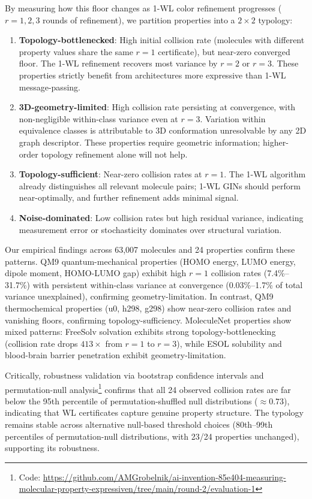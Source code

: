 \documentclass[11pt,letterpaper]{article}
\begin{document}
By measuring how this floor changes as 1-WL color refinement progresses ($r=1, 2, 3$ rounds of refinement), we partition properties into a $2\times2$ typology:

\begin{enumerate}
\item \textbf{Topology-bottlenecked}: High initial collision rate (molecules with different property values share the same $r=1$ certificate), but near-zero converged floor. The 1-WL refinement recovers most variance by $r=2$ or $r=3$. These properties strictly benefit from architectures more expressive than 1-WL message-passing.

\item \textbf{3D-geometry-limited}: High collision rate persisting at convergence, with non-negligible within-class variance even at $r=3$. Variation within equivalence classes is attributable to 3D conformation unresolvable by any 2D graph descriptor. These properties require geometric information; higher-order topology refinement alone will not help.

\item \textbf{Topology-sufficient}: Near-zero collision rates at $r=1$. The 1-WL algorithm already distinguishes all relevant molecule pairs; 1-WL GINs should perform near-optimally, and further refinement adds minimal signal.

\item \textbf{Noise-dominated}: Low collision rates but high residual variance, indicating measurement error or stochasticity dominates over structural variation.
\end{enumerate}

Our empirical findings across 63,007 molecules and 24 properties confirm these patterns. QM9 quantum-mechanical properties (HOMO energy, LUMO energy, dipole moment, HOMO-LUMO gap) exhibit high $r=1$ collision rates (7.4\%--31.7\%) with persistent within-class variance at convergence (0.03\%--1.7\% of total variance unexplained), confirming geometry-limitation. In contrast, QM9 thermochemical properties (u0, h298, g298) show near-zero collision rates and vanishing floors, confirming topology-sufficiency. MoleculeNet properties show mixed patterns: FreeSolv solvation exhibits strong topology-bottlenecking (collision rate drops $413\times$ from $r=1$ to $r=3$), while ESOL solubility and blood-brain barrier penetration exhibit geometry-limitation.

Critically, robustness validation via bootstrap confidence intervals and permutation-null analysis\footnote{Code: \url{https://github.com/AMGrobelnik/ai-invention-85e404-measuring-molecular-property-expressiven/tree/main/round-2/evaluation-1}} confirms that all 24 observed collision rates are far below the 95th percentile of permutation-shuffled null distributions ($\approx 0.73$), indicating that WL certificates capture genuine property structure. The typology remains stable across alternative null-based threshold choices (80th--99th percentiles of permutation-null distributions, with 23/24 properties unchanged), supporting its robustness.
\end{document}
